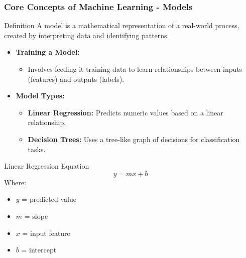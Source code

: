 \documentclass[aspectratio=169]{beamer}
\begin{document}
\begin{frame}[fragile]
    \frametitle{Core Concepts of Machine Learning - Models}
    \begin{block}{Definition}
        A model is a mathematical representation of a real-world process, created by interpreting data and identifying patterns.
    \end{block}

    \begin{itemize}
        \item \textbf{Training a Model:} 
        \begin{itemize}
            \item Involves feeding it training data to learn relationships between inputs (features) and outputs (labels).
        \end{itemize}
        \item \textbf{Model Types:}
        \begin{itemize}
            \item \textbf{Linear Regression:} Predicts numeric values based on a linear relationship.
            \item \textbf{Decision Trees:} Uses a tree-like graph of decisions for classification tasks.
        \end{itemize}
    \end{itemize}

    \begin{block}{Linear Regression Equation}
        \begin{equation}
            y = mx + b 
        \end{equation}
        Where:
        \begin{itemize}
            \item \( y \) = predicted value
            \item \( m \) = slope
            \item \( x \) = input feature
            \item \( b \) = intercept
        \end{itemize}
    \end{block}
\end{frame}
\end{document}
